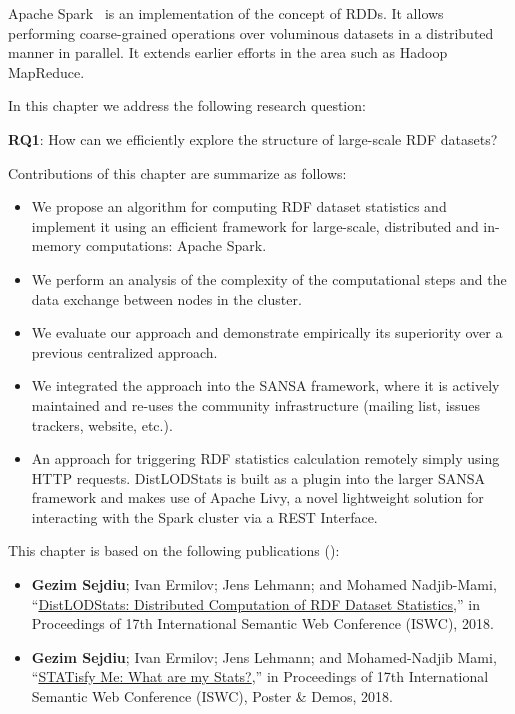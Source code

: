 Apache Spark~ is an implementation of the concept of \gls{RDD}s.
It allows performing coarse-grained operations over voluminous datasets in a distributed manner in parallel.
It extends earlier efforts in the area such as Hadoop MapReduce.

In this chapter we address the following research question:
\begin{tcolorbox}
\textbf{RQ1}: How can we efficiently explore the structure of large-scale \gls{RDF} datasets?
\end{tcolorbox}

Contributions of this chapter are summarize as follows:
\begin{itemize}
    \item We propose an algorithm for computing \gls{RDF} dataset statistics and implement it using an efficient framework for large-scale, distributed and in-memory computations: Apache Spark.
    \item We perform an analysis of the complexity of the computational steps and the data exchange between nodes in the cluster. 
    \item We evaluate our approach and demonstrate empirically its superiority over a previous centralized approach.
    \item We integrated the approach into the SANSA framework, where it is actively maintained and re-uses the community infrastructure (mailing list, issues trackers, website, etc.).
    \item An approach for triggering \gls{RDF} statistics calculation remotely simply using HTTP requests. 
    DistLODStats is built as a plugin into the larger SANSA framework and makes use of Apache Livy, a novel lightweight solution for interacting with the Spark cluster via a REST Interface.
\end{itemize}

This chapter is based on the following publications (\cite{sejdiu-2018-dist-lod-stats-iswc,sejdiu-2018-statisfy-iswc-poster}):
\begin{itemize}
    \item \textbf{Gezim Sejdiu}; Ivan Ermilov; Jens Lehmann; and Mohamed Nadjib-Mami, “\href{http://jens-lehmann.org/files/2018/iswc_distlodstats.pdf}{DistLODStats: Distributed Computation of RDF Dataset Statistics},” in Proceedings of 17th International Semantic Web Conference (ISWC), 2018.

    \item \textbf{Gezim Sejdiu}; Ivan Ermilov; Jens Lehmann; and Mohamed-Nadjib Mami, “\href{http://jens-lehmann.org/files/2018/iswc_statisfy_pd.pdf}{STATisfy Me: What are my Stats?},” in Proceedings of 17th International Semantic Web Conference (ISWC), Poster \& Demos, 2018.
\end{itemize}


